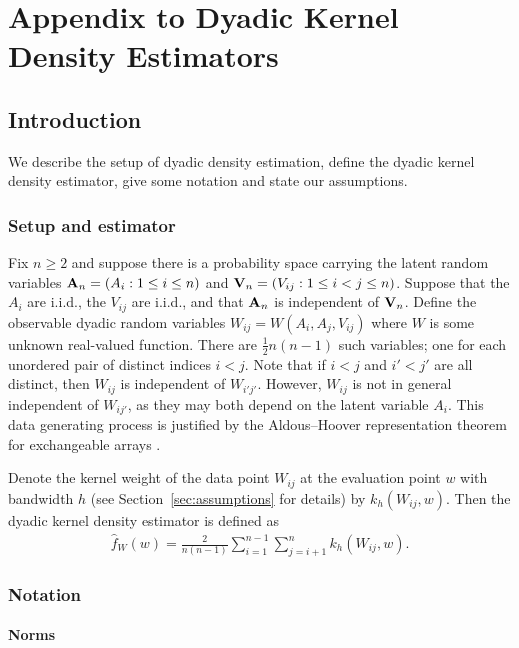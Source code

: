 
\chapter{Appendix to Dyadic Kernel Density Estimators}

\section{Introduction}

We describe the setup of
dyadic density estimation,
define the dyadic kernel density estimator,
give some notation
and state our assumptions.

\subsection{Setup and estimator}

Fix $n \geq 2$ and suppose there is
a probability space carrying the latent random variables
$\mathbf{A}_n=(A_i: 1\leq i\leq n)$ and $\mathbf{V}_n=(V_{i j}: 1\leq i<j\leq n)$.
Suppose that the $A_i$ are i.i.d., the $V_{i j}$ are i.i.d., and
that $\mathbf{A}_n$ is independent of $\mathbf{V}_n$.
Define the observable dyadic random variables
$W_{i j} = W(A_i, A_j, V_{i j})$
where $W$ is some unknown real-valued function.
There are $\frac{1}{2}n(n-1)$ such variables;
one for each unordered pair of distinct indices $i<j$.
Note that if $i<j$ and $i'<j'$ are all distinct,
then $W_{i j}$ is independent of $W_{i' j'}$.
However, $W_{i j}$ is
not in general independent of $W_{i j'}$,
as they may both depend on the latent variable $A_i$.
This data generating process is justified by the
Aldous--Hoover representation theorem for exchangeable arrays
\citep{aldous1981representations, hoover1979relations}.

Denote the kernel weight of the data point $W_{i j}$
at the evaluation point $w$
with bandwidth $h$
(see Section~\ref{sec:assumptions} for details)
by
$k_h(W_{i j}, w)$.
Then the dyadic
kernel density estimator
is defined as
\begin{align*}
  \hat f_W(w) = \frac{2}{n(n-1)}
  \sum_{i=1}^{n-1} \sum_{j=i+1}^{n} k_h(W_{i j}, w).
\end{align*}

\subsection{Notation}

\subsubsection{Norms}

